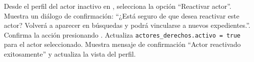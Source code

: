\begin{UCtrayectoria}
	\UCpaso[\UCactor] Desde el perfil del actor inactivo en , selecciona la opción ``Reactivar actor''.
	\UCpaso Muestra un diálogo de confirmación: ``¿Está seguro de que desea reactivar este actor? Volverá a aparecer en búsquedas y podrá vincularse a nuevos expedientes.''.
	\UCpaso[\UCactor] Confirma la acción presionando . 
	\UCpaso Actualiza \texttt{actores\_derechos.activo = true} para el actor seleccionado.
	\UCpaso Muestra mensaje de confirmación ``Actor reactivado exitosamente'' y actualiza la vista del perfil.
\end{UCtrayectoria}

